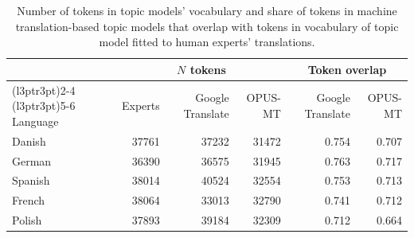 \begin{table}[!t]

\caption{\label{tab:token_overlap}Number of tokens in topic models' vocabulary and share of tokens in machine translation-based topic models that overlap with tokens in vocabulary of topic model fitted to human experts' translations.}
\centering
\fontsize{10}{12}\selectfont
\begin{tabular}[t]{lrrrrr}
\toprule
\multicolumn{1}{c}{ } & \multicolumn{3}{c}{$N$ tokens} & \multicolumn{2}{c}{Token overlap} \\
\cmidrule(l{3pt}r{3pt}){2-4} \cmidrule(l{3pt}r{3pt}){5-6}
Language & Experts & Google Translate & OPUS-MT & Google Translate & OPUS-MT\\
\midrule
Danish & 37761 & 37232 & 31472 & 0.754 & 0.707\\
German & 36390 & 36575 & 31945 & 0.763 & 0.717\\
Spanish & 38014 & 40524 & 32554 & 0.753 & 0.713\\
French & 38064 & 33013 & 32790 & 0.741 & 0.712\\
Polish & 37893 & 39184 & 32309 & 0.712 & 0.664\\
\bottomrule
\end{tabular}
\end{table}
